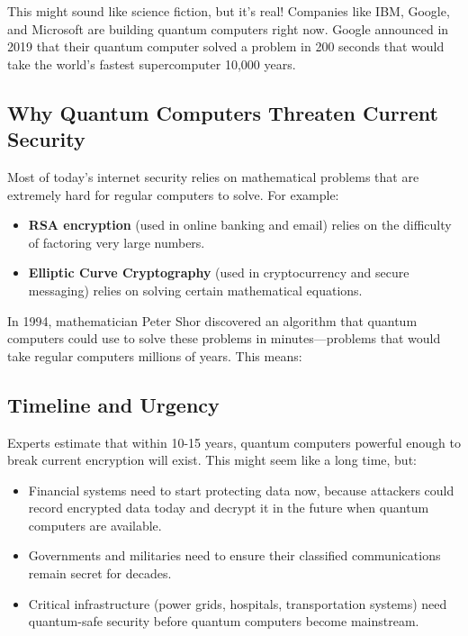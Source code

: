 \documentclass[12pt,a4paper]{report}
\begin{document}
This might sound like science fiction, but it's real! Companies like IBM, Google, and Microsoft are building quantum computers right now. Google announced in 2019 that their quantum computer solved a problem in 200 seconds that would take the world's fastest supercomputer 10,000 years.

\subsection{Why Quantum Computers Threaten Current Security}

Most of today's internet security relies on mathematical problems that are extremely hard for regular computers to solve. For example:
\begin{itemize}
\item \textbf{RSA encryption} (used in online banking and email) relies on the difficulty of factoring very large numbers.
\item \textbf{Elliptic Curve Cryptography} (used in cryptocurrency and secure messaging) relies on solving certain mathematical equations.
\end{itemize}

In 1994, mathematician Peter Shor discovered an algorithm that quantum computers could use to solve these problems in minutes—problems that would take regular computers millions of years. This means:

\begin{center}
\end{center}

\subsection{Timeline and Urgency}

Experts estimate that within 10-15 years, quantum computers powerful enough to break current encryption will exist. This might seem like a long time, but:
\begin{itemize}
\item Financial systems need to start protecting data now, because attackers could record encrypted data today and decrypt it in the future when quantum computers are available.
\item Governments and militaries need to ensure their classified communications remain secret for decades.
\item Critical infrastructure (power grids, hospitals, transportation systems) need quantum-safe security before quantum computers become mainstream.
\end{itemize}
\end{document}
